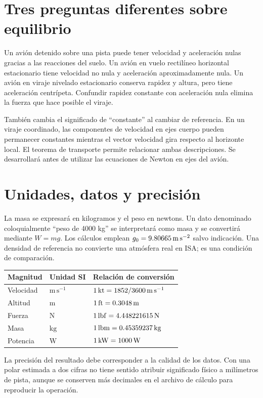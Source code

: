 
\section{Tres preguntas diferentes sobre equilibrio}
Un avión detenido sobre una pista puede tener velocidad y aceleración nulas gracias a las reacciones del suelo. Un avión en vuelo rectilíneo horizontal estacionario tiene velocidad no nula y aceleración aproximadamente nula. Un avión en viraje nivelado estacionario conserva rapidez y altura, pero tiene aceleración centrípeta. Confundir rapidez constante con aceleración nula elimina la fuerza que hace posible el viraje.

También cambia el significado de ``constante'' al cambiar de referencia. En un viraje coordinado, las componentes de velocidad en ejes cuerpo pueden permanecer constantes mientras el vector velocidad gira respecto al horizonte local. El teorema de transporte permite relacionar ambas descripciones. Se desarrollará antes de utilizar las ecuaciones de Newton en ejes del avión.

\section{Unidades, datos y precisión}
La masa se expresará en kilogramos y el peso en newtons. Un dato denominado coloquialmente ``peso de 4000 kg'' se interpretará como masa y se convertirá mediante $W=mg$. Los cálculos emplean $g_0=9.80665\,\mathrm{m\,s^{-2}}$ salvo indicación. Una densidad de referencia no convierte una atmósfera real en ISA; es una condición de comparación.

\begin{center}\begin{tabular}{lll}\toprule
Magnitud & Unidad SI & Relación de conversión\\\midrule
Velocidad & $\mathrm{m\,s^{-1}}$ & $1\,\mathrm{kt}=1852/3600\,\mathrm{m\,s^{-1}}$\\
Altitud & $\mathrm m$ & $1\,\mathrm{ft}=0.3048\,\mathrm{m}$\\
Fuerza & $\mathrm N$ & $1\,\mathrm{lbf}=4.448221615\,\mathrm{N}$\\
Masa & $\mathrm{kg}$ & $1\,\mathrm{lbm}=0.45359237\,\mathrm{kg}$\\
Potencia & $\mathrm W$ & $1\,\mathrm{kW}=1000\,\mathrm{W}$\\\bottomrule
\end{tabular}\end{center}
La precisión del resultado debe corresponder a la calidad de los datos. Con una polar estimada a dos cifras no tiene sentido atribuir significado físico a milímetros de pista, aunque se conserven más decimales en el archivo de cálculo para reproducir la operación.

